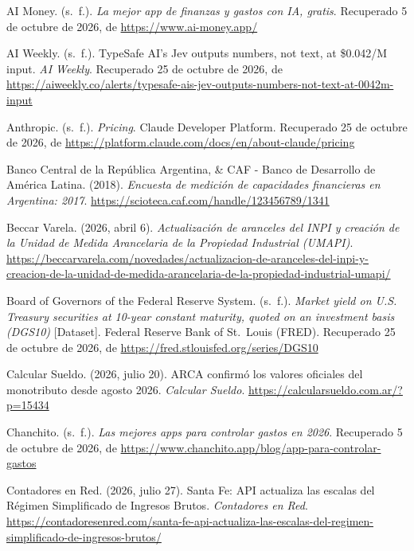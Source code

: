 \protect{}\label{refs}
\begin{CSLReferences}{1}{0}
AI Money. (s.~f.). \emph{La mejor app de finanzas y gastos con IA,
gratis}. Recuperado 5 de octubre de 2026, de
\url{https://www.ai-money.app/}

AI Weekly. (s.~f.). TypeSafe AI's Jev outputs numbers, not text, at
\$0.042/M input. \emph{AI Weekly}. Recuperado 25 de octubre de 2026, de
\url{https://aiweekly.co/alerts/typesafe-ais-jev-outputs-numbers-not-text-at-0042m-input}

Anthropic. (s.~f.). \emph{Pricing}. Claude Developer Platform.
Recuperado 25 de octubre de 2026, de
\url{https://platform.claude.com/docs/en/about-claude/pricing}

Banco Central de la República Argentina, \& CAF - Banco de Desarrollo de
América Latina. (2018). \emph{Encuesta de medición de capacidades
financieras en Argentina: 2017}.
\url{https://scioteca.caf.com/handle/123456789/1341}

Beccar Varela. (2026, abril 6). \emph{Actualización de aranceles del
INPI y creación de la Unidad de Medida Arancelaria de la Propiedad
Industrial (UMAPI)}.
\url{https://beccarvarela.com/novedades/actualizacion-de-aranceles-del-inpi-y-creacion-de-la-unidad-de-medida-arancelaria-de-la-propiedad-industrial-umapi/}

Board of Governors of the Federal Reserve System. (s.~f.). \emph{Market
yield on U.S. Treasury securities at 10-year constant maturity, quoted
on an investment basis (DGS10)} {[}Dataset{]}. Federal Reserve Bank of
St.~Louis (FRED). Recuperado 25 de octubre de 2026, de
\url{https://fred.stlouisfed.org/series/DGS10}

Calcular Sueldo. (2026, julio 20). ARCA confirmó los valores oficiales
del monotributo desde agosto 2026. \emph{Calcular Sueldo}.
\url{https://calcularsueldo.com.ar/?p=15434}

Chanchito. (s.~f.). \emph{Las mejores apps para controlar gastos en
2026}. Recuperado 5 de octubre de 2026, de
\url{https://www.chanchito.app/blog/app-para-controlar-gastos}

Contadores en Red. (2026, julio 27). Santa Fe: API actualiza las escalas
del Régimen Simplificado de Ingresos Brutos. \emph{Contadores en Red}.
\url{https://contadoresenred.com/santa-fe-api-actualiza-las-escalas-del-regimen-simplificado-de-ingresos-brutos/}


\end{CSLReferences}
